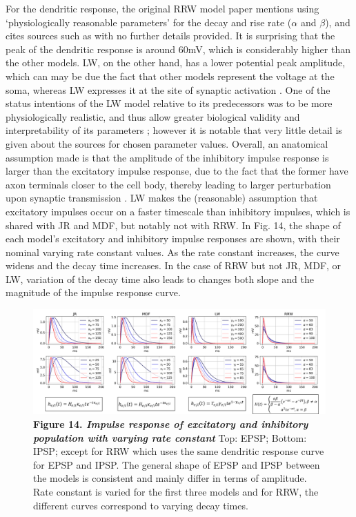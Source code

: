 \documentclass[12pt,twoside]{article}
\begin{document}
For the dendritic response, the original RRW model paper \citep{robinson1997propagation} mentions using `physiologically reasonable parameters' for the decay and rise rate ($\alpha$ and $\beta$), and cites sources such as \citet{freeman1991induced, lopes1974model, van1982model} with no further details provided. It is surprising that the peak of the dendritic response is around 60mV, which is considerably higher than the other models. LW, on the other hand, has a lower potential peak amplitude, which can may be due the fact that other models represent the voltage at the soma, whereas LW expresses it at the site of synaptic activation \citep{liley2001spatially}. One of the status intentions of the LW model relative to its predecessors was to be more physiologically realistic, and thus allow greater biological validity and interpretability of its parameters \citep{liley2001spatially}; however it is notable that very little detail is given about the sources for chosen parameter values. %
Overall, an anatomical assumption made is that the amplitude of the inhibitory impulse response is larger than the excitatory impulse response, due to the fact that the former have axon terminals closer to the cell body, thereby leading to larger perturbation upon synaptic transmission \citep{kandel2000principles,cook2021neural}. LW makes the (reasonable) assumption that excitatory impulses occur on a faster timescale than inhibitory impulses, which is shared with JR and MDF, but notably not with RRW. In Fig. 14, the shape of each model's excitatory and inhibitory impulse responses are shown, with their nominal varying rate constant values. As the rate constant increases, the curve widens and the decay time increases. In the case of RRW but not JR, MDF, or LW, variation of the decay time also leads to changes both slope and the magnitude of the impulse response curve.
\begin{figure}[H]
    \hspace{-0.5cm}
    \includegraphics[scale=0.3]{Images/Impulse_response_3_1.png}
    \caption*{\textbf{Figure 14.  \textit{Impulse response of excitatory and inhibitory population with varying rate constant}} Top: EPSP; Bottom: IPSP; except for RRW which uses the same dendritic response curve for EPSP and IPSP. The general shape of EPSP and IPSP between the models is consistent and mainly differ in terms of amplitude. Rate constant is varied for the first three models and for RRW, the different curves correspond to varying decay times. }     
    \label{fig:JR_impulse}
\end{figure}
\end{document}
